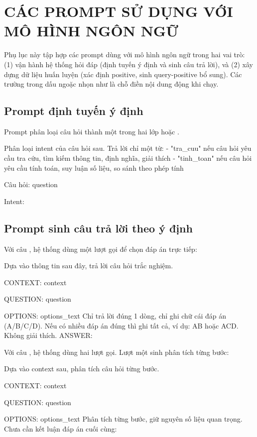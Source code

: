 \chapter{CÁC PROMPT SỬ DỤNG VỚI MÔ HÌNH NGÔN NGỮ}
\label{appendix:C}

Phụ lục này tập hợp các prompt dùng với mô hình ngôn ngữ trong hai vai trò: (1) vận hành hệ thống hỏi đáp (định tuyến ý định và sinh câu trả lời), và (2) xây dựng dữ liệu huấn luyện (xác định positive, sinh query-positive bổ sung). Các trường trong dấu ngoặc nhọn như  là chỗ điền nội dung động khi chạy.

\section{Prompt định tuyến ý định}
\label{appendix:C.1}

Prompt phân loại câu hỏi thành một trong hai lớp  hoặc .

\begin{promptbox}
Phân loại intent của câu hỏi sau. Trả lời chỉ một từ:
- "tra_cuu" nếu câu hỏi yêu cầu tra cứu, tìm kiếm thông tin, định nghĩa, giải thích
- "tinh_toan" nếu câu hỏi yêu cầu tính toán, suy luận số liệu, so sánh theo phép tính

Câu hỏi: {question}

Intent:
\end{promptbox}

\section{Prompt sinh câu trả lời theo ý định}
\label{appendix:C.2}

Với câu , hệ thống dùng một lượt gọi để chọn đáp án trực tiếp:

\begin{promptbox}
Dựa vào thông tin sau đây, trả lời câu hỏi trắc nghiệm.

CONTEXT:
{context}

QUESTION:
{question}

OPTIONS:
{options_text}
Chỉ trả lời đúng 1 dòng, chỉ ghi chữ cái đáp án (A/B/C/D).
Nếu có nhiều đáp án đúng thì ghi tất cả, ví dụ: AB hoặc ACD.
Không giải thích.
ANSWER:
\end{promptbox}

Với câu , hệ thống dùng hai lượt gọi. Lượt một sinh phân tích từng bước:

\begin{promptbox}
Dựa vào context sau, phân tích câu hỏi từng bước.

CONTEXT:
{context}

QUESTION:
{question}

OPTIONS:
{options_text}
Phân tích từng bước, giữ nguyên số liệu quan trọng.
Chưa cần kết luận đáp án cuối cùng:
\end{promptbox}

